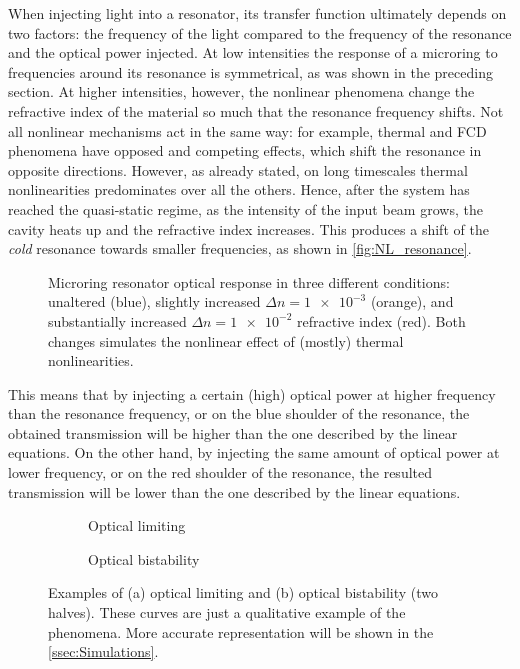 When injecting light into a resonator, its transfer function ultimately depends on two factors: the frequency of the light compared to the frequency of the resonance and the optical power injected.
At low intensities the response of a microring to frequencies around its resonance is symmetrical, as was shown in the preceding section.
At higher intensities, however, the nonlinear phenomena change the refractive index of the material so much that the resonance frequency shifts.
Not all nonlinear mechanisms act in the same way: for example, thermal and \ac{FCD} phenomena have opposed and competing effects, which shift the resonance in opposite directions.
However, as already stated, on long timescales thermal nonlinearities predominates over all the others.
Hence, after the system has reached the quasi-static regime, as the intensity of the input beam grows, the cavity heats up and the refractive index increases.
This produces a shift of the \textit{cold} resonance towards smaller frequencies, as shown in \autoref{fig:NL_resonance}.

\begin{figure}[hbtp]
	\centering
	
	\caption{Microring resonator optical response in three different conditions: unaltered (blue), slightly increased $\Delta n=\num{1e-3}$ (orange), and substantially increased $\Delta n=\num{1e-2}$ refractive index (red).
	Both changes simulates the nonlinear effect of (mostly) thermal nonlinearities.}
	\label{fig:NL_resonance}
\end{figure}

This means that by injecting a certain (high) optical power at higher frequency than the resonance frequency, or on the blue shoulder of the resonance, the obtained transmission will be higher than the one described by the linear equations.
On the other hand, by injecting the same amount of optical power at lower frequency, or on the red shoulder of the resonance, the resulted transmission will be lower than the one described by the linear equations.

\begin{figure}[htbp]
	\begin{subfigure}[b]{0.49\textwidth}
		\centering
		
		\caption{Optical limiting}
		\label{fig:optical_limiting_example}
  \end{subfigure}
  \begin{subfigure}[b]{0.49\textwidth}
  		\centering
		
		\caption{Optical bistability}
		\label{fig:bistability_example}
  \end{subfigure}
  \caption{
		Examples of (a) optical limiting and (b) optical bistability (two halves).
		These curves are just a qualitative example of the phenomena.
		More accurate representation will be shown in the \autoref{ssec:Simulations}.
  }
  	\label{fig:nonlinear_examples}
\end{figure}

